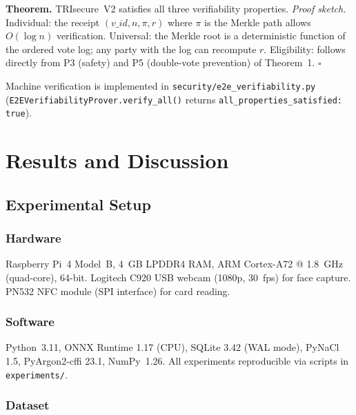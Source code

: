 \documentclass[preprint,12pt]{elsarticle}
\begin{document}
\textbf{Theorem.} TRIsecure~V2 satisfies all three verifiability properties.
\textit{Proof sketch.} Individual: the receipt $(v\_id, n, \pi, r)$ where
$\pi$ is the Merkle path allows $O(\log n)$ verification.
Universal: the Merkle root is a deterministic function of the ordered vote
log; any party with the log can recompute $r$.
Eligibility: follows directly from P3 (safety) and P5 (double-vote prevention)
of Theorem~1. $\square$

Machine verification is implemented in \texttt{security/e2e\_verifiability.py}
(\texttt{E2EVerifiabilityProver.verify\_all()} returns \texttt{all\_properties\_satisfied: true}).

\section{Results and Discussion}
\label{sec:evaluation}

\subsection{Experimental Setup}

\subsubsection{Hardware}

Raspberry Pi~4 Model~B, 4~GB LPDDR4 RAM, ARM Cortex-A72
@ 1.8~GHz (quad-core), 64-bit. Logitech C920 USB webcam (1080p, 30~fps)
for face capture. PN532 NFC module (SPI interface) for card reading.

\subsubsection{Software}

Python~3.11, ONNX Runtime 1.17 (CPU), SQLite 3.42
(WAL mode), PyNaCl 1.5, PyArgon2-cffi 23.1, NumPy~1.26. All experiments
reproducible via scripts in \texttt{experiments/}.

\subsubsection{Dataset}
\end{document}
